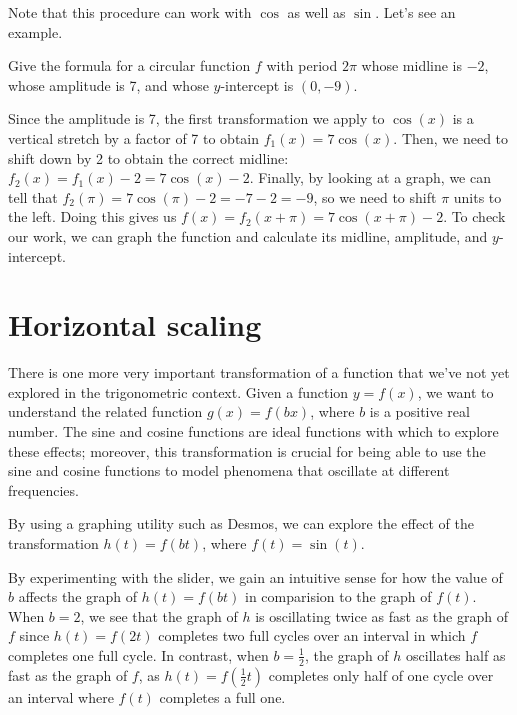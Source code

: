 \documentclass{ximera}
\begin{document}
Note that this procedure can work with $\cos$ as well as $\sin$. Let's see an example.

\begin{example}
Give the formula for a circular function $f$ with period $2\pi$ whose midline is $-2$, whose amplitude is 7, and whose $y$-intercept is $(0, -9)$.
\begin{explanation}
Since the amplitude is 7, the first transformation we apply to $\cos(x)$ is a vertical stretch by a factor of 7 to obtain $f_1(x) = 7\cos(x)$. Then, we need to shift down by 2 to obtain the correct midline: $f_2(x) = f_1(x) - 2 = 7\cos(x) - 2$. Finally, by looking at a graph, we can tell that $f_2(\pi) = 7\cos(\pi) - 2 = -7 - 2 = -9$, so we need to shift $\pi$ units to the left. Doing this gives us $f(x) = f_2(x + \pi) = 7\cos(x + \pi) - 2$. To check our work, we can graph the function and calculate its midline, amplitude, and $y$-intercept. 
\end{explanation}
\end{example} 

%
%
%

\section{Horizontal scaling}

There is one more very important transformation of a function that we've not yet explored in the trigonometric context.  Given a function \(y = f(x)\), we want to understand the related function \(g(x) = f(bx)\), where \(b\) is a positive real number.  The sine and cosine functions are ideal functions with which to explore these effects; moreover, this transformation is crucial for being able to use the sine and cosine functions to model phenomena that oscillate at different frequencies.%

By using a graphing utility such as Desmos, we can explore the effect of the transformation \(h(t) = f(bt)\), where \(f(t) = \sin(t)\).%

\begin{center}  
\end{center}

By experimenting with the slider, we gain an intuitive sense for how the value of \(b\) affects the graph of \(h(t) = f(bt)\) in comparision to the graph of \(f(t)\).  When \(b = 2\), we see that the graph of \(h\) is oscillating twice as fast as the graph of \(f\) since \(h(t) = f(2t)\) completes two full cycles over an interval in which \(f\) completes one full cycle.  In contrast, when \(b = \frac{1}{2}\), the graph of \(h\) oscillates half as fast as the graph of \(f\), as \(h(t) = f\left(\frac{1}{2}t\right)\) completes only half of one cycle over an interval where \(f(t)\) completes a full one.%
\end{document}
